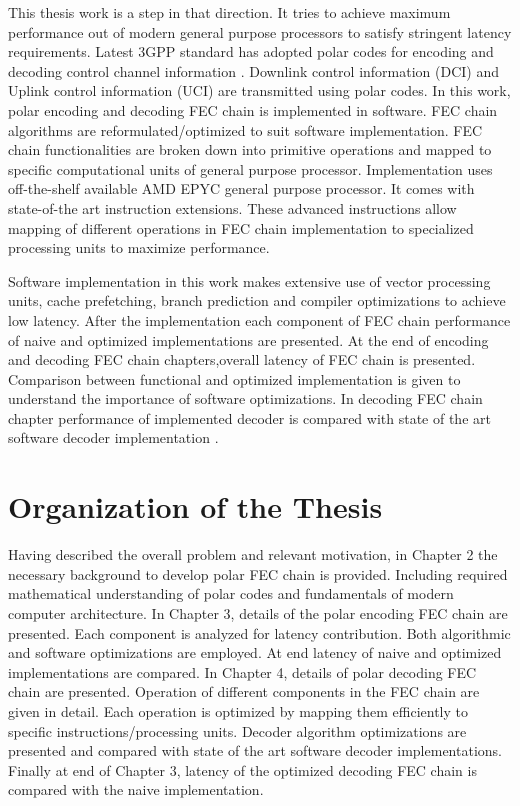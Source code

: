 This thesis work is a step in that direction. It tries to achieve maximum performance out of modern general purpose processors to satisfy stringent latency requirements. Latest 3GPP standard has adopted polar codes for encoding and decoding control channel information \cite{3gpp.38.212}. Downlink control information (DCI) and Uplink control information (UCI) are transmitted using polar codes. In this work, polar encoding and decoding FEC chain is implemented in software. FEC chain algorithms are reformulated/optimized to suit software implementation. FEC chain functionalities are broken down into primitive operations and mapped to specific computational units of general purpose processor. Implementation uses off-the-shelf available AMD EPYC general purpose processor\cite{amdEpyc}. It comes with state-of-the art instruction extensions. These advanced instructions allow mapping of different operations in FEC chain implementation to specialized processing units to maximize performance.

Software implementation in this work makes extensive use of vector processing units, cache prefetching, branch prediction and compiler optimizations to achieve low latency. After the implementation each component of FEC chain performance of naive and optimized implementations are presented. At the end of encoding and decoding FEC chain chapters,overall latency of FEC chain  is presented. Comparison between functional and optimized implementation is given to understand the importance of software optimizations. In decoding FEC chain chapter performance of implemented decoder is compared with state of the art software decoder implementation \cite{lowLatencySWPolarDec}.

\section*{Organization of the Thesis}
Having described the overall problem and relevant motivation, in Chapter 2 the necessary background to develop polar FEC chain is provided. Including required mathematical understanding of polar codes and fundamentals of modern computer architecture. In Chapter 3, details of the polar encoding FEC chain are presented. Each component is analyzed for latency contribution. Both algorithmic and software optimizations are employed. At end latency of naive and optimized implementations are compared. In Chapter 4, details of polar decoding FEC chain are presented. Operation of different components in the FEC chain are given in detail. Each operation is optimized by mapping them efficiently to specific instructions/processing units. Decoder algorithm optimizations are presented and compared with state of the art software decoder implementations. Finally at end of Chapter 3, latency of the optimized decoding FEC chain is compared with the naive implementation.